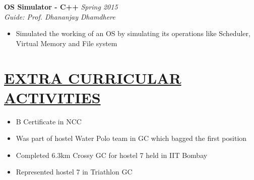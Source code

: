 \documentclass[11pt]{res}
\begin{document}
\begin{resume}
\vspace{-10pt}
\textbf{OS Simulator - C++ } \hfill \emph{Spring 2015}\\
\textsl{Guide: Prof. Dhananjay Dhamdhere}\hfill
\begin{itemize} \itemsep -2pt
\item Simulated the working of an OS by simulating its operations like Scheduler, Virtual Memory and File system
\end{itemize}

\vspace{-10pt}
\section{\underline{EXTRA CURRICULAR ACTIVITIES}}
\vspace{3pt}
\begin{itemize} \itemsep -2pt
\item B Certificate in NCC
\item Was part of hostel Water Polo team in GC which bagged the first position
\item Completed 6.3km Crossy GC for hostel 7 held in IIT Bombay
\item Represented hostel 7 in Triathlon GC
\end{itemize} 

\end{resume} 
\end{document}
